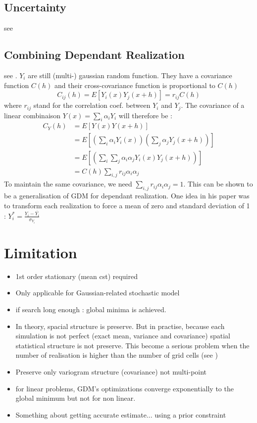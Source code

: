 \documentclass{article}
\begin{document}
\begin{multicols}{2}
\subsection{Uncertainty}
see \cite{LeRavalec-Dupin2002,LeRavalec2000}

\subsection{Combining Dependant Realization}
see \cite{Hu2002}.
$Y_i$ are still (multi-) gaussian random function. They have a covariance function $C(h)$ and their cross-covariance function is proportional to $C(h)$
\[ C_{ij}(h) = E[Y_i(x) Y_j(x+h)] = r_{ij} C(h)\]
where $r_{ij}$ stand for the correlation coef. between $Y_i$ and $Y_j$. The covariance of a linear combinaison $Y(x) = \sum_i \alpha_i Y_i$ will therefore be :
\[ 
\begin{array}{ll}
 C_Y (h) &= E[Y(x) Y(x+h)] \\
         &= E \left[ \left( \sum_i \alpha_i Y_i(x) \right) \left( \sum_j \alpha_j Y_j(x+h) \right) \right] \\
         &= E\left[\left(\sum_i \sum_j \alpha_i \alpha_j Y_i(x) Y_j(x+h)    \right)\right] \\
         &= C(h) \sum_{i,j} r_{ij} \alpha_i \alpha_j 
\end{array}
\]
To maintain the same covariance, we need $\sum_{i,j} r_{ij} \alpha_i \alpha_j =1$. This can be shown to be a generalisation of GDM for dependant realization. 
One idea in his paper was to transform each realization to force a mean of zero and standard deviation of 1 : $Y_i^*=\frac{Y_i-\bar{Y_i}}{\sigma_{Y_i}}$


\section{Limitation}
\begin{itemize}
\item 1st order stationary (mean cst) required
\item Only applicable for Gaussian-related stochastic model
\item if search long enough : global minima is achieved.
\item In theory, spacial structure is preserve. But in practise, because each simulation is not perfect (exact mean, variance and covariance) spatial statistical structure is not preserve. This become a serious problem when the number of realisation is higher than the number of grid cells (see \cite{Hu2002})
\item Preserve only variogram structure (covariance) not multi-point
\item for linear problems, GDM's optimizations  converge exponentially to the global minimum but not for non linear. 
\item Something about getting accurate estimate... using a prior constraint \cite{LeRavalec-Dupin2002}
\end{itemize}


\end{multicols}
\end{document}
